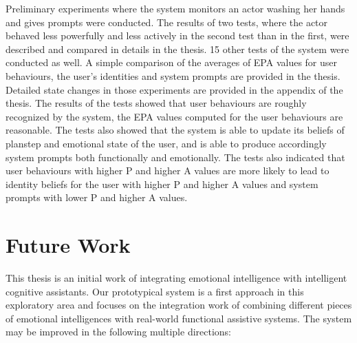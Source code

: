 Preliminary experiments where the system monitors an actor washing her hands and gives prompts were conducted. The results of two tests, where the actor behaved less powerfully and less actively in the second test than in the first, were described and compared in details in the thesis. 15 other tests of the system were conducted as well. A simple comparison of the averages of EPA values for user behaviours, the user's identities and system prompts are provided in the thesis. Detailed state changes in those experiments are provided in the appendix of the thesis. The results of the tests showed that user behaviours are roughly recognized by the system, the EPA values computed for the user behaviours are reasonable. The tests also showed that the system is able to update its beliefs of planstep and emotional state of the user, and is able to produce accordingly system prompts both functionally and emotionally. The tests also indicated that user behaviours with higher P and higher A values are more likely to lead to identity beliefs for the user with higher P and higher A values and system prompts with lower P and higher A values.


\section{Future Work}

This thesis is an initial work of integrating emotional intelligence with intelligent cognitive assistants. Our prototypical system is a first approach in this exploratory area and focuses on the integration work of combining different pieces of emotional intelligences with real-world functional assistive systems. The system may be improved in the following multiple directions:

